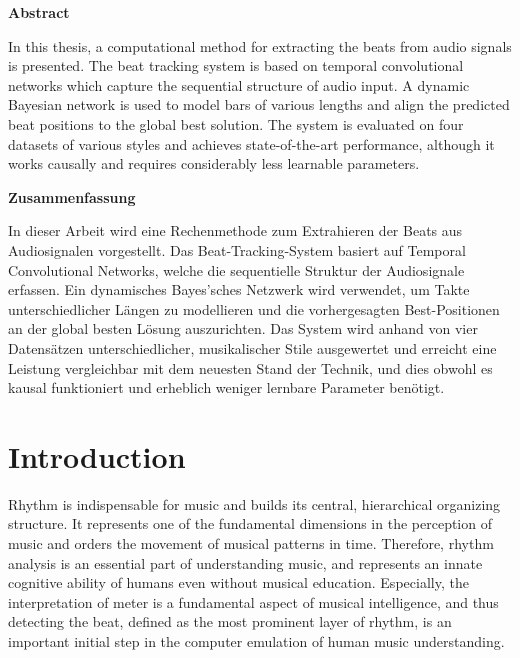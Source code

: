 \documentclass{scrartcl}
\begin{document}
\newpage 
\begin{center} 
\textsf{\textbf{Abstract}}
\end{center}

In this thesis, a computational method for extracting the beats from audio signals is presented. The beat tracking system is based on temporal convolutional networks which capture the sequential structure of audio input. A dynamic Bayesian network is used to model bars of various lengths and align the predicted beat positions to the global best solution. The system is evaluated on four datasets of various styles and achieves state-of-the-art performance, although it works causally and requires considerably less learnable parameters.  



\vspace{15em}


\begin{center} 
\textsf{\textbf{Zusammenfassung}}
\end{center}

In dieser Arbeit wird eine Rechenmethode zum Extrahieren der Beats aus Audiosignalen vorgestellt. Das Beat-Tracking-System basiert auf Temporal Convolutional Networks, welche die sequentielle Struktur der Audiosignale erfassen. Ein dynamisches Bayes'sches Netzwerk wird verwendet, um Takte unterschiedlicher Längen zu modellieren und die vorhergesagten Best-Positionen an der global besten Lösung auszurichten. Das System wird anhand von vier Datensätzen unterschiedlicher, musikalischer Stile ausgewertet und erreicht eine Leistung vergleichbar mit dem neuesten Stand der Technik, und dies obwohl es kausal funktioniert und erheblich weniger lernbare Parameter benötigt.

\newpage

\tableofcontents
\newpage



\section{Introduction}
\label{sec:introduction}

Rhythm is indispensable for music and builds its central, hierarchical organizing structure. It represents one of the fundamental dimensions in the perception of music and orders the movement of musical patterns in time. Therefore, rhythm analysis is an essential part of understanding music, and represents an innate cognitive ability of humans even without musical education. Especially, the interpretation of meter is a fundamental aspect of musical intelligence, and thus detecting the beat, defined as the most prominent layer of rhythm, is an important initial step in the computer emulation of human music understanding. 
\end{document}
